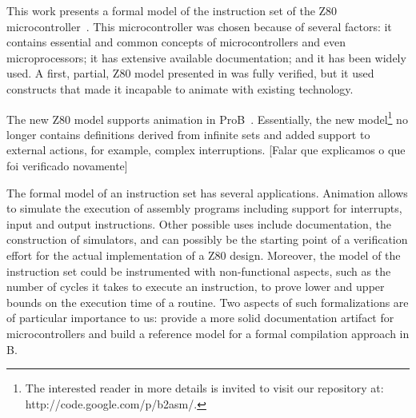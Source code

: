 \documentclass[a4paper]{llncs}
\begin{document}
This work presents a formal model of the instruction set of the Z80
microcontroller~\cite{Z80_manual}. This microcontroller was chosen
because of several factors: it contains essential and common concepts
of microcontrollers and even microprocessors; it has extensive
available documentation; and it has been widely used.  A first,
partial, Z80 model presented in \cite{Valerio_SBMF09} was fully
verified, but it used constructs that made it incapable to animate 
with existing technology. %

The new Z80 model supports animation in ProB~\cite{proB}.  Essentially, the
new model\footnote{The interested reader in more details is invited to visit
our repository at: http://code.google.com/p/b2asm/.} no longer contains
definitions derived from infinite sets and added support to external actions, 
for example, complex interruptions.  [Falar que explicamos o que foi verificado novamente]

The formal model of an instruction set has several
applications. Animation allows to simulate the execution of assembly
programs including support for interrupts, input and output
instructions. Other possible uses include documentation, the
construction of simulators, and can possibly be the starting point of
a verification effort for the actual implementation of a Z80
design. Moreover, the model of the instruction set could be
instrumented with non-functional aspects, such as the number of cycles
it takes to execute an instruction, to prove lower and upper bounds on
the execution time of a routine.  Two aspects of such formalizations
are of particular importance to us: provide a more solid documentation
artifact for microcontrollers and build a reference model for a formal
compilation approach in B.
\end{document}
